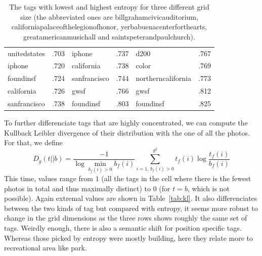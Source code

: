 \begin{table}[ht]
\begin{tabular}{lclclc}
unitedstates     & .703 & iphone                 & .737 & d200                & .767 \\
iphone           & .720 & california             & .738 & color               & .769 \\
foundinsf        & .724 & sanfrancisco           & .744 & northerncalifornia  & .773 \\
california       & .726 & gwsf                   & .766 & gwsf                & .812 \\
sanfrancisco     & .738 & foundinsf              & .803 & foundinsf           & .825 \\
\bottomrule
\end{tabular}
\caption{The tags with lowest and highest entropy for three different grid
	size (the abbreviated ones are \textsf{billgrahamcivicauditorium},
	\textsf{californiapalaceofthelegionofhonor},
	\textsf{yerbabuenacenterforthearts}, \textsf{greatamericanmusichall} and
\textsf{saintspeterandpaulchurch}).\label{tab:entropy}}
\end{table}

To further differenciate tags that are highly concentrated, we can compute the
Kullback Leibler divergence of their distribution with the one of all the
photos. For that, we define \[D_g(t||b) = \frac{-1}{\log
	\min_{b_f(i)>0}b_f(i)}\sum_{i=1,\, b_f(i)>0}^{g^2} t_f(i)\log
\frac{t_f(i)}{b_f(i)}\] This time, values range from $1$ (all the tags in the
cell where there is the fewest photos in total and thus maximally distinct) to
$0$ (for $t=b$, which is not possible). Again extremal values are shown in
Table~\vref{tab:kl}.  It also differenciates between the two kinds of tag but
compared with entropy, it seems more robust to change in the grid dimensions
as the three rows shows roughly the same set of tags. Weirdly enough, there is
also a semantic shift for position specific tags. Whereas those picked by
entropy were mostly building, here they relate more to recreational area like
park.

